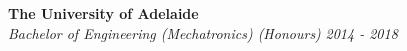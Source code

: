 {\textbf{The University of Adelaide}} \\
\headerrow
    {\emph{Bachelor of Engineering (Mechatronics) (Honours)}}
    {\emph{2014 - 2018}}